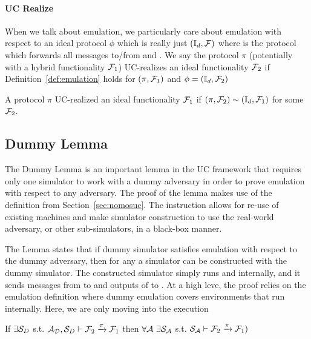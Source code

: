 \paragraph{UC Realize}
When we talk about emulation, we particularly care about emulation with respect to an ideal protocol $\phi$ which is really just $(\mathbb{I}_d, \mathcal{F})$ where \idealP is the protocol which forwards all messages to/from \Z and \F.
We say the protocol $\pi$ (potentially with a hybrid functionality $\mathcal{F}_1$) UC-realizes an ideal functionality $\mathcal{F}_2$ if Definition~\ref{def:emulation} holds for $(\pi, \mathcal{F}_1)$ and  $\phi = (\mathbb{I}_d, \mathcal{F}_2)$

\begin{definition}[UC-Realize]
A protocol $\pi$ UC-realized an ideal functionality $\mathcal{F}_1$ if $(\pi, \mathcal{F}_2) \sim (\mathbb{I}_d, \mathcal{F}_1)$ for some $\mathcal{F}_2$.
\end{definition}

\subsection{Dummy Lemma}
The Dummy Lemma is an important lemma in the UC framework that requires only one simulator to work with a dummy adversary in order to prove emulation with respect to any adversary.
The proof of the lemma makes use of the  definition from Section~\ref{sec:nomosuc}.
The instruction allows for re-use of existing machines and make simulator construction to use the real-world adversary, or other sub-simulators, in a black-box manner.

The Lemma states that if dummy simulator satisfies emulation with respect to the dummy adversary, then for any \A a simulator can be constructed with the dummy simulator. 
The constructed simulator simply runs \A and \DS internally, and it sends messages from \Z to \A and outputs of \A to \DS.
At a high leve, the proof relies on the emulation definition where dummy emulation covers environments that run \A internally. Here, we are only moving \A into the execution

\begin{theorem}\label{thm:dummy}
If $\exists \mathcal{S}_{D}$ s.t. $ \mathcal{A}_\mathcal{D}, \mathcal{S}_{D} \vdash \mathcal{F}_2 \xrightarrow{\pi} \mathcal{F}_1$ then $\forall \mathcal{A} \ \exists \mathcal{S}_\mathcal{A}$ s.t. $\mathcal{S}_{\mathcal{A}} \vdash  \mathcal{F}_2 \xrightarrow{\pi} \mathcal{F}_1)$ 
\end{theorem}

